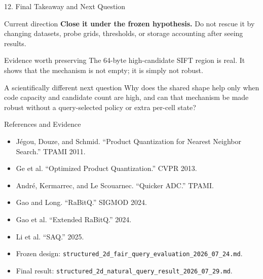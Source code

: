 \documentclass[aspectratio=169]{beamer}
\begin{document}
\begin{frame}{12. Final Takeaway and Next Question}
\begin{alertblock}{Current direction}
\textbf{Close it under the frozen hypothesis.} Do not rescue it by changing
datasets, probe grids, thresholds, or storage accounting after seeing results.
\end{alertblock}
\begin{block}{Evidence worth preserving}
The 64-byte high-candidate SIFT region is real. It shows that the mechanism is
not empty; it is simply not robust.
\end{block}
\begin{block}{A scientifically different next question}
Why does the shared shape help only when code capacity and candidate count are
high, and can that mechanism be made robust without a query-selected policy
or extra per-cell state?
\end{block}
\end{frame}

\begin{frame}[allowframebreaks]{References and Evidence}
\tiny
\begin{itemize}
  \item Jégou, Douze, and Schmid. ``Product Quantization for Nearest Neighbor
  Search.'' TPAMI 2011.
  \item Ge et al. ``Optimized Product Quantization.'' CVPR 2013.
  \item André, Kermarrec, and Le Scouarnec. ``Quicker ADC.'' TPAMI.
  \item Gao and Long. ``RaBitQ.'' SIGMOD 2024.
  \item Gao et al. ``Extended RaBitQ.'' 2024.
  \item Li et al. ``SAQ.'' 2025.
  \item Frozen design:
  \texttt{structured\_2d\_fair\_query\_evaluation\_2026\_07\_24.md}.
  \item Final result:
  \texttt{structured\_2d\_natural\_query\_result\_2026\_07\_29.md}.
\end{itemize}
\end{frame}
\end{document}
